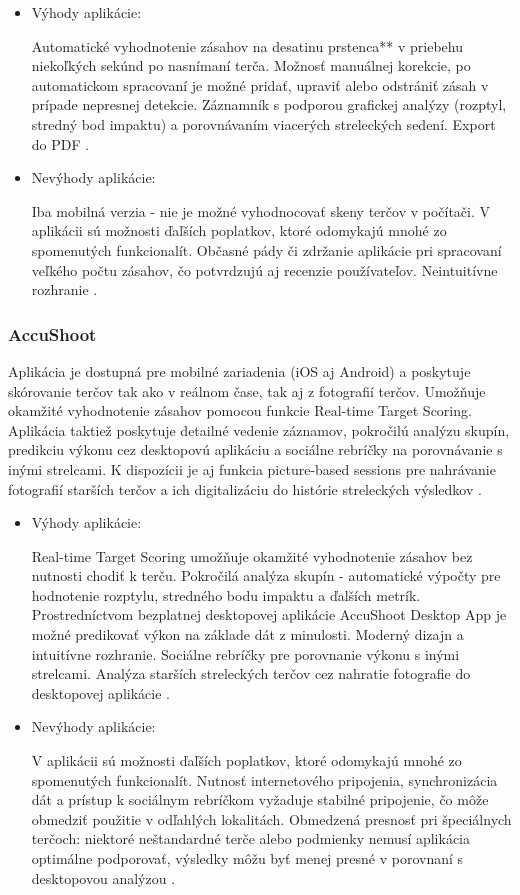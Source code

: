 \begin{itemize}
  \item Výhody aplikácie:

  Automatické vyhodnotenie zásahov na desatinu prstenca** v priebehu niekoľkých sekúnd po nasnímaní terča.
  Možnosť manuálnej korekcie, po automatickom spracovaní je možné pridať, upraviť alebo odstrániť zásah v prípade nepresnej detekcie.
  Záznamník s podporou grafickej analýzy (rozptyl, stredný bod impaktu) a porovnávaním viacerých streleckých sedení.
  Export do PDF \cite{BlackholeApp}.

  \item Nevýhody aplikácie:

  Iba mobilná verzia - nie je možné vyhodnocovať skeny terčov v počítači.
  V aplikácii sú možnosti ďaľších poplatkov, ktoré odomykajú mnohé zo spomenutých funkcionalít.
  Občasné pády či zdržanie aplikácie pri spracovaní veľkého počtu zásahov, čo potvrdzujú aj recenzie používateľov.
  Neintuitívne rozhranie \cite{BlackholeApp}.
\end{itemize}

\subsubsection{AccuShoot}
Aplikácia je dostupná pre mobilné zariadenia (iOS aj Android) a poskytuje skórovanie terčov tak ako v reálnom čase, tak aj z fotografií 
terčov. Umožňuje okamžité vyhodnotenie zásahov pomocou funkcie Real-time Target Scoring. Aplikácia taktiež poskytuje detailné vedenie 
záznamov, pokročilú analýzu skupín, predikciu výkonu cez desktopovú aplikáciu a sociálne rebríčky na porovnávanie s inými strelcami. 
K dispozícii je aj funkcia picture-based sessions pre nahrávanie fotografií starších terčov a ich digitalizáciu do histórie streleckých 
výsledkov \cite{AccuShootApp}.

\begin{itemize}
  \item Výhody aplikácie:

  Real-time Target Scoring umožňuje okamžité vyhodnotenie zásahov bez nutnosti chodiť k terču.  
  Pokročilá analýza skupín - automatické výpočty pre hodnotenie rozptylu, stredného bodu impaktu a ďalších metrík.
  Prostredníctvom bezplatnej desktopovej aplikácie AccuShoot Desktop App je možné predikovať výkon na základe dát z minulosti. 
  Moderný dizajn a intuitívne rozhranie.
  Sociálne rebríčky pre porovnanie výkonu s inými strelcami. 
  Analýza starších streleckých terčov cez nahratie fotografie do desktopovej aplikácie \cite{AccuShootApp}.

  \item Nevýhody aplikácie:

  V aplikácii sú možnosti ďaľších poplatkov, ktoré odomykajú mnohé zo spomenutých funkcionalít.
  Nutnosť internetového pripojenia, synchronizácia dát a prístup k sociálnym rebríčkom vyžaduje stabilné pripojenie, 
  čo môže obmedziť použitie v odľahlých lokalitách. 
  Obmedzená presnosť pri špeciálnych terčoch: niektoré neštandardné terče alebo podmienky nemusí aplikácia optimálne podporovať, 
  výsledky môžu byť menej presné v porovnaní s desktopovou analýzou \cite{AccuShootApp}.
\end{itemize}


